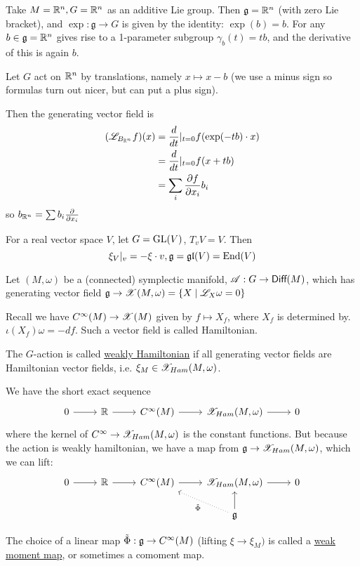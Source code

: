 \documentclass[x11names,reqno,14pt]{extarticle}
\newcommand{\mk}[1]{\mathfrak{#1}}
\newcommand{\g}{\mk{g}}
\newcommand{\dd}[2]{\frac{d#1}{d#2}}
\newcommand{\pp}[2]{\frac{\partial #1}{\partial #2}}
\newcommand{\gl}{\mk{g}\mk{l}}
\begin{document}
\exm

Take $M = \mathbb{R}^n, G = \mathbb{R}^n$ as an additive Lie group. Then $\g = \R^n$ (with zero Lie bracket), and $\exp:\g\to G$ is given by the identity: $\exp(b) = b$. For any $b \in \g = \R^n$ gives rise to a 1-parameter subgroup $\gamma_b(t) = tb$, and the derivative of this is again $b$. 

Let $G$ act on $\mathbb{R}^n$ by translations, namely $x \mapsto x - b$ (we use a minus sign so formulas turn out nicer, but can put a plus sign). 

Then the generating vector field is 
\begin{align*}
(\ms{L}_{B_{\R^n}}f)(x) & = \dd{}{t}|_{t=0} f(\exp(-tb)\cdot x) \\
& = \dd{}{t}|_{t=0}f(x + tb) \\
& = \sum_i\pp{f}{x_i}b_i\\
\end{align*}
so $b_{\R^n} = \sum b_i\pp{}{x_i}$

For a real vector space $V$, let $G = {\mathrm{GL}}(V)$, $T_vV = V$. Then 
\[
\xi_V|_v = -\xi\cdot v, \g = \gl(V) = \End(V)
\]

Let $(M,\omega)$ be a (connected) symplectic manifold, $\mathscr{A}:G\to{{\text{\sffamily {Diff}}}}(M)$, which has generating vector field $\g\to\ms{X}(M,\omega) = \{X \mid \ms{L}_X\omega = 0\}$

Recall we have $C^\infty(M) \to \mathscr{X}(M)$ given by $f \mapsto X_f$, where $X_f$ is determined by. $\iota(X_f)\omega = -df$. Such a vector field is called Hamiltonian.


The $G$-action is called \underline{weakly Hamiltonian} if all generating vector fields are Hamiltonian vector fields, i.e. $\xi_M \in \mathscr{X}_{Ham}(M,\omega)$. 

We have the short exact sequence 
\[
\exactshort{\R}{}{C^\oo(M)}{}{\ms{X}_{Ham}(M,\omega)}
\]
where the kernel of $C^\infty\to \mathscr{X}_{Ham}(M,\omega)$ is the constant functions. But because the action is weakly hamiltonian, we have a map from $\g\to\ms{X}_{Ham}(M,\omega)$, which we can lift: 
\[
\begin{tikzcd}
0 \ar[r] & \R \ar[r] & C^\oo(M) \ar[r] & \ms{X}_{Ham}(M,\omega) \ar[r] & 0 \\
&&& \g \ar[u] \ar[ul, dotted, "\tilde{\Phi}"] 
\end{tikzcd}
\]

The choice of a linear map $\tilde{\Phi}:\g\to C^\oo(M)$ (lifting $\xi \to \xi_M)$ is called a \underline{weak moment map}, or sometimes a comoment map. 
\end{document}
